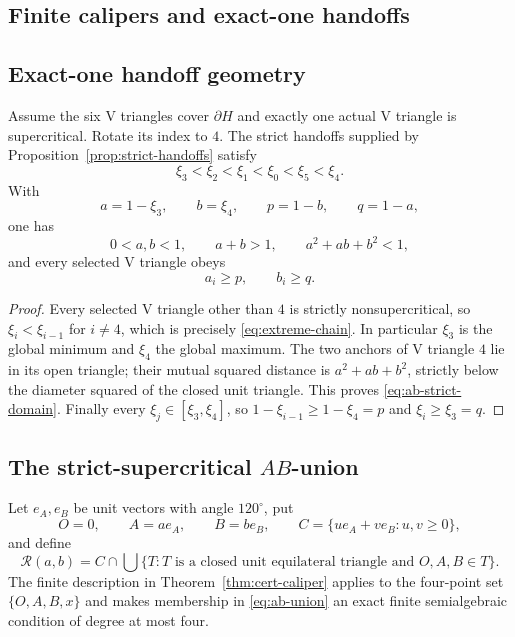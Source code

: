 \subsection{Finite calipers and exact-one handoffs}



\subsection{Exact-one handoff geometry}

\begin{lemma}
\label{lem:ab-extreme-jump}
Assume the six V triangles cover $\partial H$ and exactly one actual V triangle is
supercritical.  Rotate its index to $4$.  The strict handoffs supplied by
Proposition~\ref{prop:strict-handoffs} satisfy
\[
 \xi_3<\xi_2<\xi_1<\xi_0<\xi_5<\xi_4.                       \label{eq:extreme-chain}
\]
With
\[
 a=1-\xi_3,\qquad b=\xi_4,\qquad p=1-b,\qquad q=1-a,
\]
one has
\begin{equation}
 0<a,b<1,\qquad a+b>1,\qquad a^2+ab+b^2<1,       \label{eq:ab-strict-domain}
\end{equation}
and every selected V triangle obeys
\[
 a_i\ge p,\qquad b_i\ge q.
\]
\end{lemma}

\begin{proof}
Every selected V triangle other than $4$ is strictly nonsupercritical, so
$\xi_i<\xi_{i-1}$ for $i\ne4$, which is precisely
\eqref{eq:extreme-chain}.  In particular $\xi_3$ is the global minimum and
$\xi_4$ the global maximum.  The two anchors of V triangle $4$ lie in its open triangle;
their mutual squared distance is $a^2+ab+b^2$, strictly below the diameter
squared of the closed unit triangle.  This proves \eqref{eq:ab-strict-domain}.
Finally every $\xi_j\in[\xi_3,\xi_4]$, so
$1-\xi_{i-1}\ge1-\xi_4=p$ and $\xi_i\ge \xi_3=q$.
\end{proof}


\subsection{The strict-supercritical $AB$-union}

Let $e_A,e_B$ be unit vectors with angle $120^\circ$, put
\[
 O=0,\qquad A=ae_A,\qquad B=be_B,
 \qquad
 C=\{ue_A+ve_B:u,v\ge0\},
\]
and define
\begin{equation}
 \mathcal R(a,b)=
 C\cap\bigcup\{T:T\text{ is a closed unit equilateral triangle and }
 O,A,B\in T\}.                               \label{eq:ab-union}
\end{equation}
The finite description in Theorem~\ref{thm:cert-caliper} applies to the
four-point set $\{O,A,B,x\}$ and makes membership in \eqref{eq:ab-union} an
exact finite semialgebraic condition of degree at most four.

